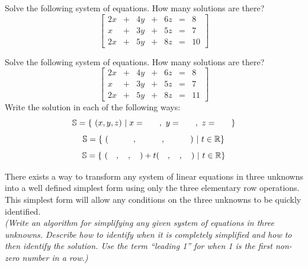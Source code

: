  
  \begin{myexb}[\bd{b}]
  	Solve the following system of equations. How many solutions are there?
    \[	\left[ \begin{array}{ccccccc}
  	2x & + & 4y & + & 6z & = & 8 \\
  	x & + & 3y & +  & 5z & = & 7 \\
  	2x & + & 5y & + & 8z & = & 10
  	\end{array} \right] \]
  \end{myexb} 
 
 
 
  \begin{myexc}[\bd{c}]
  	Solve the following system of equations. How many solutions are there? 
  	\[	\left[ \begin{array}{ccccccc}
  	2x & + & 4y & + & 6z & = & 8 \\
  	x & + & 3y & +  & 5z & = & 7 \\
  	2x & + & 5y & + & 8z & = & 11
  	\end{array} \right] \]
  	Write the solution in each of the following ways:
  	\[ \mathbb{S} = \{\ ({x},{y},{z}) \ | \; x=\quad \quad ,\  y=\quad \quad,\  z=\quad \quad\}\] \[ \mathbb{S} = \{\ ({\quad \quad \quad},{\quad \quad \quad},{\quad \quad \quad})\ |\ t \in \mathbb{R}\} \]
  	\[ \mathbb{S} = \{\  ({\quad},{\quad},{\quad})+t({\quad },{\quad},{\quad}) \   | \ t \in \mathbb{R} \}\]
  \end{myexc} 
 
 \begin{theorem}
 	There exists a way to transform any system of linear equations in three unknowns into a well defined simplest form using only the three elementary row operations.  This simplest form will allow any conditions on the three unknowns to be quickly identified. \\  \it{ (Write an algorithm for simplifying any given system of equations in three unknowns. Describe how to identify when it is completely simplified and how to then identify the solution. Use the term ``leading 1''  for when 1 is the first non-zero number in a row.) }
 \end{theorem}
\vspace{-.3in}\hspace{5in}\begin{annotation}
\end{annotation}


